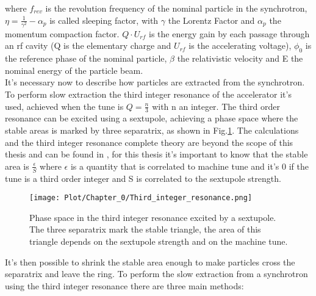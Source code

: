 \documentclass[12pt,a4paper]{report}
\begin{document}
	where $f_{rev}$ is the revolution frequency of the nominal particle in the synchrotron, $\eta = \frac{1}{\gamma^2} - \alpha_p$ is called sleeping factor, with $\gamma$ the Lorentz Factor and $\alpha_p$ the momentum compaction factor. $Q \cdot U_{rf}$ is the energy gain by each passage through an rf cavity (Q is the elementary charge and $U_{rf}$ is the accelerating voltage), $\phi_0$ is the reference phase of the nominal particle, $\beta$ the relativistic velocity and E the nominal energy of the particle beam.\\
	It's necessary now to describe how particles are extracted from the synchrotron. To perform slow extraction the third integer resonance of the accelerator it's used, achieved when the tune is $Q=\frac{n}{3}$ with n an integer. The third order resonance can be excited using a sextupole, achieving a phase space where the stable areas is marked by three separatrix, as shown in Fig.\ref{Third_resonance}. The calculations and the third integer resonance complete theory are beyond the scope of this thesis and can be found in \cite{Cern_slow_extraction}, for this thesis it's important to know that the stable area is $\frac{\epsilon}{S}$ where $\epsilon$ is a quantity that is correlated to machine tune and it's 0 if the tune is a third order integer and S is correlated to the sextupole strength. \\
	\begin{figure} [H]
		\centering
		\texttt{[image: Plot/Chapter\_0/Third\_integer\_resonance.png]}
		\caption{\small{Phase space in the third integer resonance excited by a sextupole. The three separatrix mark the stable triangle, the area of this triangle depends on the sextupole strength and on the machine tune.}}
		\label{Third_resonance}
	\end{figure}
	It's then possible to shrink the stable area enough to make particles cross the separatrix and leave the ring. To perform the slow extraction from a synchrotron using the third integer resonance there are three main methods:
\end{document}
